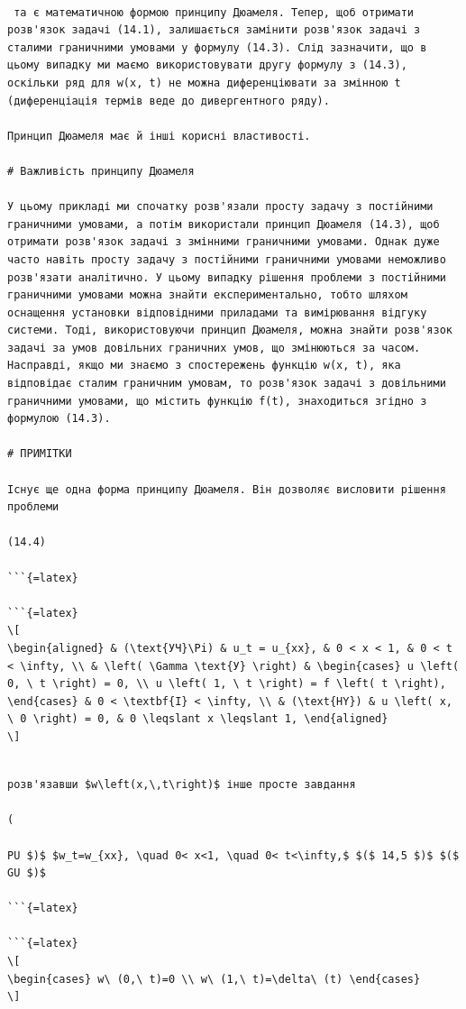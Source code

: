 \documentclass[
]{article}
\begin{document}
\begin{verbatim}

 та є математичною формою принципу Дюамеля. Тепер, щоб отримати розв'язок задачі (14.1), залишається замінити розв'язок задачі з сталими граничними умовами у формулу (14.3). Слід зазначити, що в цьому випадку ми маємо використовувати другу формулу з (14.3), оскільки ряд для w(x, t) не можна диференціювати за змінною t (диференціація термів веде до дивергентного ряду).

Принцип Дюамеля має й інші корисні властивості.

# Важливість принципу Дюамеля

У цьому прикладі ми спочатку розв'язали просту задачу з постійними граничними умовами, а потім використали принцип Дюамеля (14.3), щоб отримати розв'язок задачі з змінними граничними умовами. Однак дуже часто навіть просту задачу з постійними граничними умовами неможливо розв'язати аналітично. У цьому випадку рішення проблеми з постійними граничними умовами можна знайти експериментально, тобто шляхом оснащення установки відповідними приладами та вимірювання відгуку системи. Тоді, використовуючи принцип Дюамеля, можна знайти розв'язок задачі за умов довільних граничних умов, що змінюються за часом. Насправді, якщо ми знаємо з спостережень функцію w(x, t), яка відповідає сталим граничним умовам, то розв'язок задачі з довільними граничними умовами, що містить функцію f(t), знаходиться згідно з формулою (14.3).

# ПРИМІТКИ

Існує ще одна форма принципу Дюамеля. Він дозволяє висловити рішення проблеми

(14.4)

```{=latex}

```{=latex}
\[
\begin{aligned} & (\text{УЧ}\Pi) & u_t = u_{xx}, & 0 < x < 1, & 0 < t < \infty, \\ & \left( \Gamma \text{У} \right) & \begin{cases} u \left( 0, \ t \right) = 0, \\ u \left( 1, \ t \right) = f \left( t \right), \end{cases} & 0 < \textbf{I} < \infty, \\ & (\text{HY}) & u \left( x, \ 0 \right) = 0, & 0 \leqslant x \leqslant 1, \end{aligned}
\]
\end{verbatim}

\begin{verbatim}

розв'язавши $w\left(x,\,t\right)$ інше просте завдання

(

PU $)$ $w_t=w_{xx}, \quad 0< x<1, \quad 0< t<\infty,$ $($ 14,5 $)$ $($ GU $)$ 

```{=latex}

```{=latex}
\[
\begin{cases} w\ (0,\ t)=0 \\ w\ (1,\ t)=\delta\ (t) \end{cases}
\]
\end{verbatim}
\end{document}
